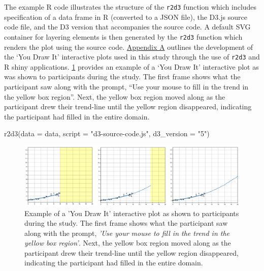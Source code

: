 \documentclass[print]{nuthesis}
\newenvironment{Shaded}{\begin{snugshade}}{\end{snugshade}}
\newcommand{\AttributeTok}[1]{\textcolor[rgb]{0.77,0.63,0.00}{#1}}
\newcommand{\FunctionTok}[1]{\textcolor[rgb]{0.00,0.00,0.00}{#1}}
\newcommand{\NormalTok}[1]{#1}
\newcommand{\StringTok}[1]{\textcolor[rgb]{0.31,0.60,0.02}{#1}}
\begin{document}
The example R code illustrates the structure of the \texttt{r2d3} function which includes specification of a data frame in R (converted to a JSON file), the D3.js source code file, and the D3 version that accompanies the source code.
A default SVG container for layering elements is then generated by the \texttt{r2d3} function which renders the plot using the source code.
\protect\hyperlink{youdrawit-with-shiny}{Appendix A} outlines the development of the `You Draw It' interactive plots used in this study through the use of \texttt{r2d3} and R shiny applications.
\cref{fig:youdrawit-example} provides an example of a `You Draw It' interactive plot as was shown to participants during the study.
The first frame shows what the participant saw along with the prompt, ``Use your mouse to fill in the trend in the yellow box region''.
Next, the yellow box region moved along as the participant drew their trend-line until the yellow region disappeared, indicating the participant had filled in the entire domain.

\begin{Shaded}
\begin{Highlighting}[]
\FunctionTok{r2d3}\NormalTok{(}\AttributeTok{data =}\NormalTok{ data, }\AttributeTok{script =} \StringTok{"d3{-}source{-}code.js"}\NormalTok{,}
    \AttributeTok{d3\_version =} \StringTok{"5"}\NormalTok{)}
\end{Highlighting}
\end{Shaded}

\begin{figure}[tbp]

{\centering \includegraphics[width=1\linewidth,]{images/02-you-draw-it/ydiExample-0.10-10-linear} 

}

\caption['You Draw It' Example]{Example of a 'You Draw It' interactive plot as shown to participants during the study. The first frame shows what the participant saw along with the prompt, \textit{'Use your mouse to fill in the trend in the yellow box region'}. Next, the yellow box region moved along as the participant drew their trend-line until the yellow region disappeared, indicating the participant had filled in the entire domain.}\label{fig:youdrawit-example}
\end{figure}
\end{document}
